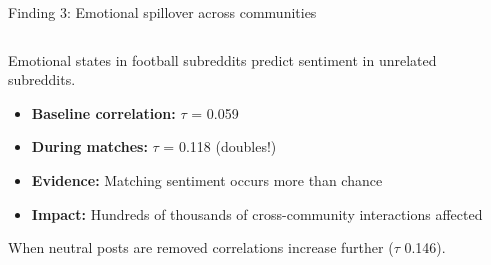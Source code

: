 \documentclass[10pt]{beamer}
\begin{document}
\begin{frame}{Finding 3: Emotional spillover across communities}

\begin{columns}
\begin{column}{0.55\textwidth}
Emotional states in football subreddits predict sentiment in unrelated subreddits.

\begin{itemize}
\item \textbf{Baseline correlation:} $\tau$ = 0.059
\item \textbf{During matches:} $\tau$ = 0.118 (doubles!)
\item \textbf{Evidence:} Matching sentiment occurs more than chance
\item \textbf{Impact:} Hundreds of thousands of cross-community interactions affected
\end{itemize}

When neutral posts are removed correlations increase further ($\tau$ 0.146).
\end{column}

\begin{column}{0.45\textwidth}
\centering

\begin{table}[ht]
\centering
{}
\caption{Kendall's $\tau$ correlation for the sentiment of paired posts by the same user.}
\label{tab:sentiment_correlations_combined}
\end{table}

\begin{table}
  \centering
  \caption{Pearson $\chi$² standardised residuals for paired sentiment categories.}
  \label{tab:chi-2-test}
\end{table}


\end{column}
\end{columns}
\end{frame}
\end{document}
